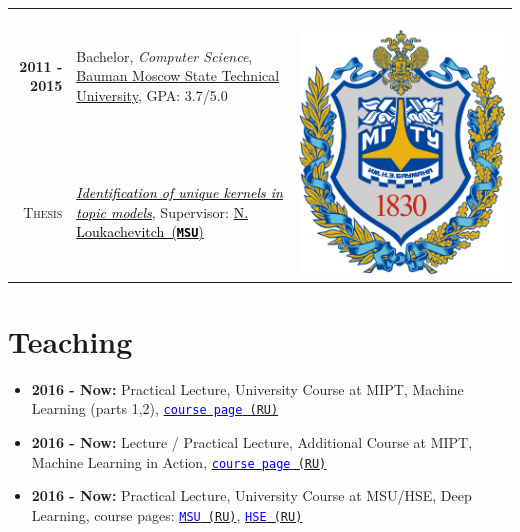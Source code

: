 \documentclass[a4paper,10pt]{article} %
\begin{document}
\begin{tabular}{rp{14cm}c}	
\textbf{2011 -  2015} & Bachelor, \emph{Computer Science}, \href{http://www.bmstu.ru/en/}{Bauman Moscow State Technical University}, GPA: 3.7/5.0 & \multirow{2}{*}{~~~~~\includegraphics[scale=0.012]{img/bmstu}}\\
\textsc{Thesis} &\emph{\href{https://github.com/ars-ashuha/bigram-anchor-words}{\textcolor{black}{Identification of unique kernels in topic models}}}, Supervisor:  \href{http://istina.msu.ru/profile/louk_nat/}{\textcolor{black}{N. Loukachevitch~(\texttt{\textbf{MSU}})}}
\end{tabular}

\section{Teaching}
\begin{itemize}
	\item \textbf{2016 - Now:} Practical Lecture, University Course at MIPT, Machine Learning (parts 1,2), \href{https://ml-mipt.github.io/}{\texttt{\textcolor{blue}{course page} (RU)}}
	\item \textbf{2016 - Now:} Lecture / Practical Lecture, Additional Course at MIPT, Machine Learning in Action, \href{https://vk.com/data_mining_in_action}{\texttt{\textcolor{blue}{course page} (RU)}}
	\item \textbf{2016 - Now:} Practical Lecture, University Course at MSU/HSE, Deep Learning, course pages:  \href{https://goo.gl/3wXB4f}{\texttt{\textcolor{blue}{MSU} (RU)}},  \href{https://goo.gl/3wXB4f}{\texttt{\textcolor{blue}{HSE} (RU)}}
\end{itemize}
\end{document}
